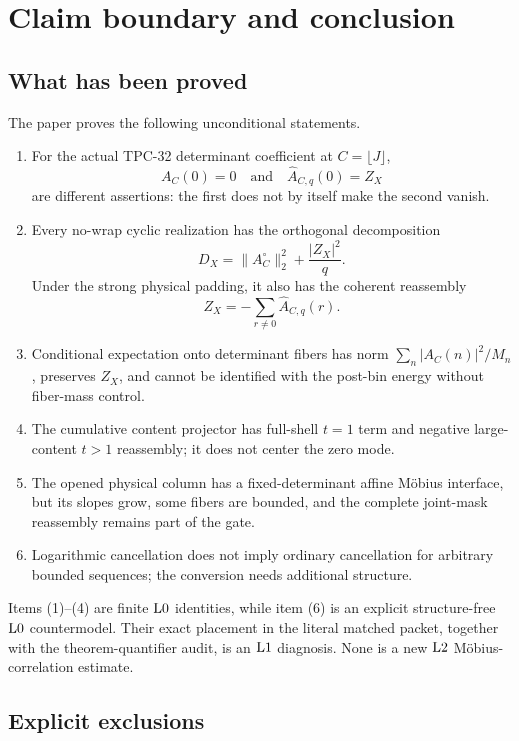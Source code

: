 \section{Claim boundary and conclusion}
\label{sec:claim-boundary}

\subsection{What has been proved}

The paper proves the following unconditional statements.
\begin{enumerate}[label=\textup{(\arabic*)},leftmargin=2.5em]
 \item For the actual TPC-32 determinant coefficient at
 \(C=\lfloor J\rfloor\),
 \[
 A_C(0)=0
 \quad\text{and}\quad
 \widehat A_{C,q}(0)=Z_X
 \]
 are different assertions: the first does not by itself make the
 second vanish.
 \item Every no-wrap cyclic realization has the orthogonal
 decomposition
 \[
 D_X=\|A_C^\circ\|_2^2+\frac{|Z_X|^2}{q}.
 \]
 Under the strong physical padding, it also has the coherent
 reassembly
 \[
 Z_X=-\sum_{r\ne0}\widehat A_{C,q}(r).
 \]
 \item Conditional expectation onto determinant fibers has norm
 \(\sum_n|A_C(n)|^2/M_n\), preserves \(Z_X\), and cannot be identified
 with the post-bin energy without fiber-mass control.
 \item The cumulative content projector has full-shell \(t=1\) term
 and negative large-content \(t>1\) reassembly; it does not center the
 zero mode.
 \item The opened physical column has a fixed-determinant affine
 M\"obius interface, but its slopes grow, some fibers are bounded,
 and the complete joint-mask reassembly remains part of the gate.
 \item Logarithmic cancellation does not imply ordinary cancellation
 for arbitrary bounded sequences; the conversion needs additional
 structure.
\end{enumerate}

Items (1)--(4) are finite \(\mathrm{L0}\) identities, while item (6) is an
explicit structure-free \(\mathrm{L0}\) countermodel.  Their exact placement
in the literal matched packet, together with the theorem-quantifier
audit, is an \(\mathrm{L1}\) diagnosis.  None is a new \(\mathrm{L2}\)
M\"obius-correlation estimate.

\subsection{Explicit exclusions}


